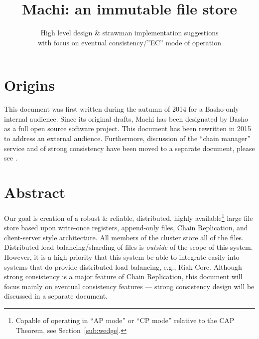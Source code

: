 \documentclass[preprint,10pt]{sigplanconf}
\begin{document}

\conferenceinfo{}{} 


\title{Machi: an immutable file store}
\subtitle{High level design \& strawman implementation suggestions \\
          with focus on eventual consistency/''EC'' mode of operation}


\maketitle

\section{Origins}
\label{sec:origins}

This document was first written during the autumn of 2014 for a
Basho-only internal audience.  Since its original drafts, Machi has
been designated by Basho as a full open source software project.  This
document has been rewritten in 2015 to address an external audience.
Furthermore, discussion of the ``chain manager'' service and of strong
consistency have been moved to a separate document, please see
\cite{machi-chain-manager-design}.

\section{Abstract}
\label{sec:abstract}

Our goal
is creation of a robust \& reliable, distributed, highly
available\footnote{Capable of operating in ``AP mode'' or 
  ``CP mode'' relative to the CAP Theorem, see
  Section~\ref{sub:wedge}.}
large file
store based upon write-once registers, append-only files,
Chain Replication, and
client-server style architecture.  All
members of the cluster store all of the files.  Distributed load
balancing/sharding of files is {\em outside} of the scope of this system.
However, it is a high priority that this system be able to integrate
easily into systems that do provide distributed load balancing, e.g.,
Riak Core.  Although strong consistency is a major feature of Chain
Replication, this document will focus mainly on eventual consistency
features --- strong consistency design will be discussed in a separate
document.
\end{document}
